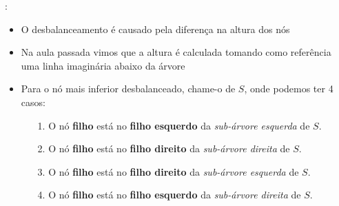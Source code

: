 \begin{frame}[fragile]{\secname : \subsecname}
  \begin{itemize}
  \item O desbalanceamento é causado pela diferença na altura dos nós
  \item Na aula passada vimos que a altura é calculada tomando como referência uma linha imaginária abaixo da árvore
  \item Para o nó mais inferior desbalanceado, chame-o de $S$, onde podemos ter 4 casos:
    \begin{itemize}
      \item[1.] O nó \textbf{filho} está no \textbf{filho esquerdo} da \emph{sub-árvore esquerda} de $S$.
      \item[2.] O nó \textbf{filho} está no \textbf{filho direito} da \emph{sub-árvore direita} de $S$.
      \item[3.] O nó \textbf{filho} está no \textbf{filho direito} da \emph{sub-árvore esquerda} de $S$. 
      \item[4.] O nó \textbf{filho} está no \textbf{filho esquerdo} da \emph{sub-árvore direita} de $S$. 
    \end{itemize}
  \end{itemize}
\end{frame}






